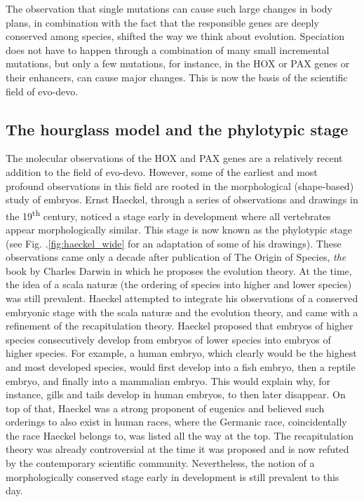 The observation that single mutations can cause such large changes in body plans, in combination with the fact that the responsible genes are deeply conserved among species, shifted the way we think about evolution. Speciation does not have to happen through a combination of many small incremental mutations, but only a few mutations, for instance, in the HOX or PAX genes or their enhancers, can cause major changes. This is now the basis of the scientific field of evo-devo.

\subsection{The hourglass model and the phylotypic stage}

The molecular observations of the HOX and PAX genes are a relatively recent addition to the field of evo-devo. However, some of the earliest and most profound observations in this field are rooted in the morphological (shape-based) study of embryos. Ernst Haeckel, through a series of observations and drawings in the 19\textsuperscript{th} century\cite{haeckel1866}, noticed a stage early in development where all vertebrates appear morphologically similar. This stage is now known as the phylotypic stage (see Fig. \thechapter.\ref{fig:haeckel_wide} for an adaptation of some of his drawings). These observations came only a decade after publication of The Origin of Species, \textit{the} book by Charles Darwin in which he proposes the evolution theory. At the time, the idea of a scala naturæ (the ordering of species into higher and lower species) was still prevalent. Haeckel attempted to integrate his observations of a conserved embryonic stage with the scala naturæ and the evolution theory, and came with a refinement of the recapitulation theory. Haeckel proposed that embryos of higher species consecutively develop from embryos of lower species into embryos of higher species. For example, a human embryo, which clearly would be the highest and most developed species, would first develop into a fish embryo, then a reptile embryo, and finally into a mammalian embryo. This would explain why, for instance, gills and tails develop in human embryos, to then later disappear. On top of that, Haeckel was a strong proponent of eugenics and believed such orderings to also exist in human races, where the Germanic race, coincidentally the race Haeckel belongs to, was listed all the way at the top\cite{Levit2020}. The recapitulation theory was already controversial at the time it was proposed and is now refuted by the contemporary scientific community. Nevertheless, the notion of a morphologically conserved stage early in development is still prevalent to this day.

